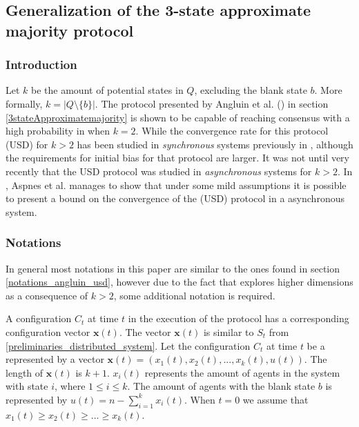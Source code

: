 \subsection{Generalization of the 3-state approximate majority protocol}

 \subsubsection{Introduction}
Let $k$ be the amount of potential states in $Q$, excluding the blank state $b$. More formally, $k = |Q \setminus \{b\}|$. The protocol presented by Angluin et al. (\cite{angluinSimplePopulationProtocol2008}) in section \ref{3stateApproximatemajority} is shown to be capable of reaching consensus with a high probability in  when $k = 2$. While the convergence rate for this protocol (USD) for $k > 2$ has been studied in \emph{synchronous} systems previously in \cite{becchetti2015}, although the requirements for initial bias for that protocol are larger. It was not until very recently that the USD protocol was studied in \emph{asynchronous} systems for $k > 2$. In \cite{AspnesFastConverganceOfKOpinion2023}, Aspnes et al. manages to show that under some mild assumptions it is possible to present a bound on the convergence of the (USD) protocol in a asynchronous system. 

\subsubsection{Notations}

In general most notations in this paper are similar to the ones found in section \ref{notations_angluin_usd}, however due to the fact that \cite{AspnesFastConverganceOfKOpinion2023} explores higher dimensions as a consequence of $k > 2$, some additional notation is required.

A configuration $C_t$ at time $t$ in the execution of the protocol has a corresponding configuration vector $\textbf{x}(t)$. The vector $\textbf{x}(t)$ is similar to $S_t$ from \ref{preliminaries_distributed_system}. Let the configuration $C_t$ at time $t$ be a represented by a vector $\textbf{x}(t) = (x_1(t), x_2(t), ..., x_k(t), u(t))$. The length of $\textbf{x}(t)$ is $k + 1$. $x_i(t)$ represents the amount of agents in the system with state $i$, where $1 \leq i \leq k$. The amount of agents with the blank state $b$ is represented by $u(t) = n - \sum_{i=1}^k x_i(t)$. When $t = 0$ we assume that $x_1(t) \geq x_2(t) \geq ... \geq x_k(t)$. 

